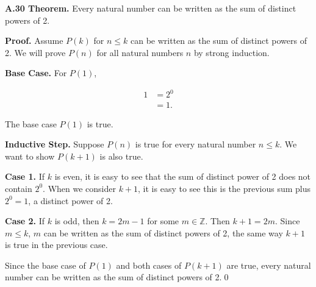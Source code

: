 \documentclass[12pt]{article}
\begin{document}
\noindent\textbf{A.30 Theorem.} Every natural number can be written as the sum of distinct powers of 2.

\bigskip

\noindent\textbf{Proof.} Assume $P(k)$ for $n\leq k$ can be written as the sum of distinct powers of 2. We will prove $P(n)$ for all natural numbers $n$ by strong induction. 

\bigskip

\noindent\textbf{Base Case.} For $P(1)$,

\begin{align*}
1 &= 2^0 \\
&= 1.
\end{align*}

\noindent The base case $P(1)$ is true.

\bigskip

\noindent\textbf{Inductive Step.} Suppose $P(n)$ is true for every natural number $n\leq k$. We want to show $P(k+1)$ is also true.

\bigskip

\noindent\textbf{Case 1.} If $k$ is even, it is easy to see that the sum of distinct power of 2 does not contain $2^0$. When we consider $k+1$, it is easy to see this is the previous sum plus $2^0=1$, a distinct power of 2.

\bigskip

\noindent\textbf{Case 2.} If $k$ is odd, then $k=2m-1$ for some $m\in\mathbb{Z}$. Then $k+1=2m$. Since $m\leq k$, $m$ can be written as the sum of distinct powers of 2, the same way $k+1$ is true in the previous case.

\bigskip

\noindent Since the base case of $P(1)$ and both cases of $P(k+1)$ are true, every natural number can be written as the sum of distinct powers of 2.\qed
\end{document}

